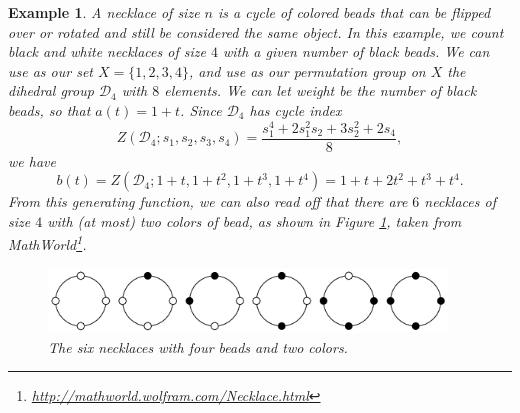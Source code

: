 \documentclass[12pt]{article}
\theoremstyle{plain}
\newtheorem{exa}{Example}
\begin{document}
\begin{exa}
A \emph{necklace} of size \(n \) is a cycle of colored beads that can be flipped over or rotated and still be considered the same object.
In this example, we count black and white necklaces of size \( 4 \) with a given number of black beads.
We can use as our set \( X = \{1,2,3,4\} \), and use as our permutation group on \( X \) the dihedral group \( \mathcal{D}_4 \) with \( 8 \) elements.
We can let weight be the number of black beads, so that \( a(t) = 1 + t \).
Since \( \mathcal{D}_4 \) has cycle index
\[ Z(\mathcal{D}_4; s_1, s_2, s_3, s_4) = \frac{s_1^4+2 s_1^2 s_2+3 s_2^2+2 s_4}{8}, \]
we have
\[ b(t) = Z(\mathcal{D}_4; 1+t, 1+t^2, 1+t^3, 1+t^4) = 1+t+2 t^2+t^3+t^4. \]
From this generating function, we can also read off that there are \(6\) necklaces of size \( 4 \) with (at most) two colors of bead, as shown in Figure \ref{fig:necklaces}, taken from MathWorld\footnote{
 \url{http://mathworld.wolfram.com/Necklace.html}
}.%

\begin{figure}
\centering  \includegraphics[width=400px]{necklaces}
\caption{The six necklaces with four beads and two colors. \label{fig:necklaces}}
\end{figure}
\end{exa}
\end{document}
